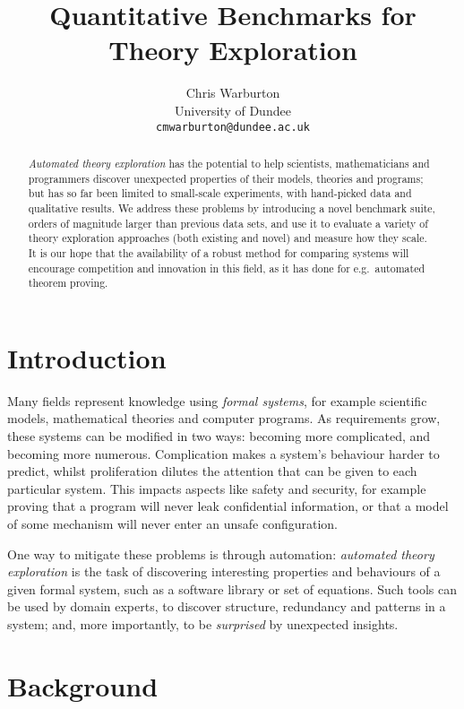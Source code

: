 \documentclass[]{default}
\title{Quantitative Benchmarks for Theory Exploration}
\author{Chris Warburton \\
          University of Dundee \\
          \texttt{cmwarburton@dundee.ac.uk}}
\date{}
\begin{document}
\maketitle
\begin{abstract}
  \emph{Automated theory exploration} has the potential to help scientists,
  mathematicians and programmers discover unexpected properties of their models,
  theories and programs; but has so far been limited to small-scale experiments,
  with hand-picked data and qualitative results. We address these problems by
  introducing a novel benchmark suite, orders of magnitude larger than previous
  data sets, and use it to evaluate a variety of theory exploration approaches
  (both existing and novel) and measure how they scale. It is our hope that the
  availability of a robust method for comparing systems will encourage
  competition and innovation in this field, as it has done for e.g.\ automated
  theorem proving.
\end{abstract}

\section{Introduction}\label{introduction}

Many fields represent knowledge using \emph{formal systems}, for example
scientific models, mathematical theories and computer programs. As requirements
grow, these systems can be modified in two ways: becoming more complicated, and
becoming more numerous. Complication makes a system's behaviour harder to
predict, whilst proliferation dilutes the attention that can be given to each
particular system. This impacts aspects like safety and security, for example
proving that a program will never leak confidential information, or that a model
of some mechanism will never enter an unsafe configuration.

One way to mitigate these problems is through automation: \emph{automated theory
exploration} is the task of discovering interesting properties and behaviours of
a given formal system, such as a software library or set of equations. Such
tools can be used by domain experts, to discover structure, redundancy and
patterns in a system; and, more importantly, to be \emph{surprised} by
unexpected insights.

\section{Background}\label{background}
\end{document}

